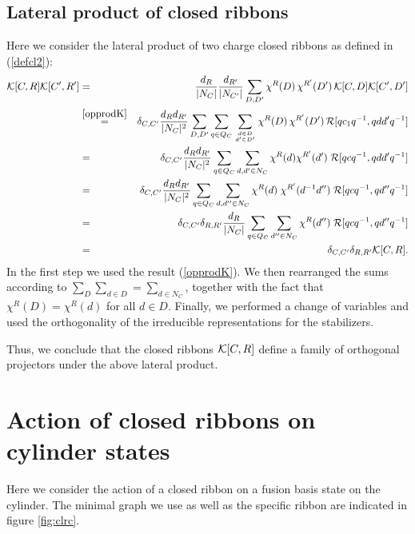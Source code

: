 \documentclass[nofootinbib,superscriptaddress,eqsecnum,tightenlines,11pt]{revtex4-1}
\def\ba{\begin{eqnarray}}
\def\ea{\end{eqnarray}}
\begin{document}
\subsection{Lateral product of closed ribbons} \label{appOP2}

Here we consider the lateral product of two charge closed ribbons as defined in (\ref{defcl2}):
\ba
	{\cal K}[C , R]  {\cal K}[ C', R'] %
	& =& \frac{ d_R}{|N_C|}  \frac{d_{R'}}{|N_{C'}|}  \sum_{D,D'} {\chi^R(D)}  \, {\chi^{R'}(D')}
	\, \mathcal{K}[C,D] \mathcal{K}[C',D'] \\
	&  \stackrel{\eqref{opprodK}}{=}&\delta_{C,C'}  \frac{ d_Rd_{R'}}{|N_C|^2} \sum_{D,D'}\sum_{q \in Q_C}\sum_{d \in D \atop d' \in D'} {\chi^R(D)}  \, {\chi^{R'}(D')}
	\, \mathcal{R}[qc_1q^{-1},qdd'q^{-1}]\\
%
	& = & \delta_{C , C'}\frac{ d_R d_{R'} }{|N_C|^2}    \sum_{q\in Q_C} \sum_{d, d'\in N_C} {\chi^R(d)}  {\chi^{R'}(d')} \; {\cal R}[q c {q}^{-1} ,  q d d' {q}^{-1} ] \notag\\
%
	& = & \delta_{C , C'}\frac{ d_R d_{R'} }{|N_C|^2}   \sum_{q\in Q_C}  \sum_{d, d''\in N_C}  {\chi^R(d)}  \; {\chi^{R'} (d^{-1} d'')} \; {\cal R}[q c {q}^{-1} ,  q d'' {q}^{-1} ] \notag\\
%
	& = &\delta_{C , C'} \delta_{R, R'}\frac{ d_R  }{|N_C|}   \sum_{q\in Q_C}  \sum_{d''\in N_C} {\chi^R(d'')}  \; {\cal R}[q c {q}^{-1} ,  q d'' {q}^{-1} ] \notag\\
%
	& = &\delta_{C , C'} \delta_{R, R'} {\cal K}[C , R].
\ea
In the first step we used the result (\ref{opprodK}). We then rearranged the sums according to $\sum_D \sum_{d\in D} = \sum_{d\in N_C}$, together with the fact that $\chi^R(D) = \chi^R(d)$ for all $d\in D$. Finally, we performed a change of variables and used the orthogonality of the irreducible representations for the stabilizers. 

Thus, we conclude that the closed ribbons ${\cal K}[C,R]$ define a family of orthogonal projectors under the above lateral product.


\section{Action of closed ribbons on cylinder states}\label{app:clrc}

Here we consider the action of a closed ribbon on a fusion basis state on the cylinder. The minimal graph we use as well as the specific ribbon are indicated in figure \ref{fig:clrc}.
\end{document}
